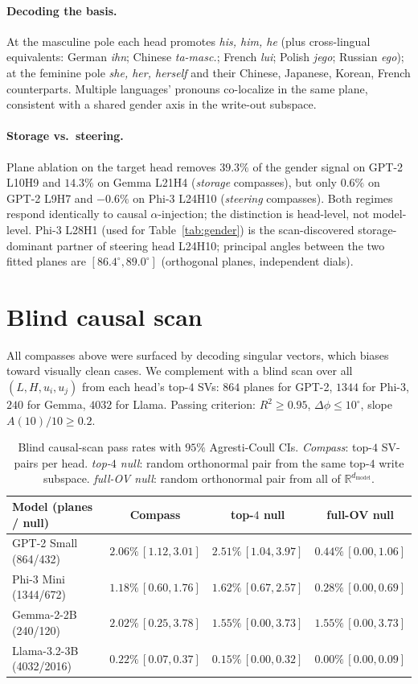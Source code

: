 \paragraph{Decoding the basis.} At the masculine pole each head
promotes \emph{his, him, he} (plus cross-lingual equivalents:
German \emph{ihn}; Chinese \emph{ta-masc.}; French \emph{lui};
Polish \emph{jego}; Russian \emph{ego}); at the feminine pole
\emph{she, her, herself} and their Chinese, Japanese, Korean,
French counterparts. Multiple languages' pronouns co-localize in
the same plane, consistent with a shared gender axis in the
write-out subspace.

\paragraph{Storage vs.\ steering.} Plane ablation on the target
head removes $39.3\%$ of the gender signal on GPT-2 L10H9 and
$14.3\%$ on Gemma L21H4 (\emph{storage} compasses), but only
$0.6\%$ on GPT-2 L9H7 and $-0.6\%$ on Phi-3 L24H10
(\emph{steering} compasses). Both regimes respond
identically to causal $\alpha$-injection; the distinction is
head-level, not model-level. Phi-3 L28H1 (used for
Table~\ref{tab:gender}) is the scan-discovered storage-dominant
partner of steering head L24H10; principal angles between the
two fitted planes are $[86.4^\circ, 89.0^\circ]$ (orthogonal
planes, independent dials).

\section{Blind causal scan}
\label{sec:scan}

All compasses above were surfaced by decoding singular vectors, which
biases toward visually clean cases. We complement with a blind scan
over all $(L, H, u_i, u_j)$ from each head's top-$4$ SVs: $864$
planes for GPT-2, $1344$ for Phi-3, $240$ for Gemma, $4032$ for
Llama. Passing criterion: $R^2\ge 0.95$, $\Delta\phi\le 10^\circ$,
slope $A(10)/10\ge 0.2$.

\begin{table}[h]
\centering
\small
\caption{Blind causal-scan pass rates with $95\%$ Agresti-Coull CIs.
\emph{Compass}: top-$4$ SV-pairs per head. \emph{top-$4$ null}: random
orthonormal pair from the same top-$4$ write subspace. \emph{full-OV
null}: random orthonormal pair from all of
$\mathbb{R}^{d_\text{model}}$.}
\label{tab:scan}
\begin{tabular}{lccc}
\toprule
Model (planes / null) & Compass & top-$4$ null & full-OV null \\
\midrule
GPT-2 Small (864/432)    & $2.06\%\,[1.12,3.01]$ & $2.51\%\,[1.04,3.97]$ & $0.44\%\,[0.00,1.06]$ \\
Phi-3 Mini (1344/672)    & $1.18\%\,[0.60,1.76]$ & $1.62\%\,[0.67,2.57]$ & $0.28\%\,[0.00,0.69]$ \\
Gemma-2-2B (240/120)     & $2.02\%\,[0.25,3.78]$ & $1.55\%\,[0.00,3.73]$ & $1.55\%\,[0.00,3.73]$ \\
Llama-3.2-3B (4032/2016) & $0.22\%\,[0.07,0.37]$ & $0.15\%\,[0.00,0.32]$ & $0.00\%\,[0.00,0.09]$ \\
\bottomrule
\end{tabular}
\end{table}

